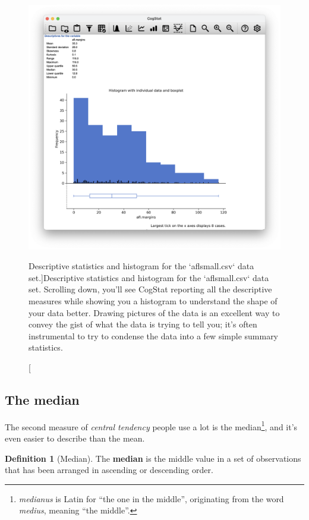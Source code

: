 \documentclass[
  11pt,
]{book}
\theoremstyle{definition}
\newtheorem{definition}{Definition}[chapter]
\theoremstyle{definition}
\theoremstyle{definition}
\theoremstyle{definition}
\theoremstyle{remark}
\begin{document}
\begin{figure}

{\centering \includegraphics[width=0.66\linewidth]{resources/image/cogstathistogramaflsmall} 

}

\caption[Descriptive statistics and histogram for the `aflsmall.csv` data set.]{Descriptive statistics and histogram for the `aflsmall.csv` data set. Scrolling down, you'll see CogStat reporting all the descriptive measures while showing you a histogram to understand the shape of your data better. Drawing pictures of the data is an excellent way to convey the gist of what the data is trying to tell you; it's often instrumental to try to condense the data into a few simple summary statistics.}\label{fig:histogramaflsmall}
\end{figure}

\hypertarget{median}{%
\subsection{The median}\label{median}}

The second measure of \emph{central tendency} people use a lot is the median\footnote{\emph{medianus} is Latin for ``the one in the middle'', originating from the word \emph{medius}, meaning ``the middle''.}, and it's even easier to describe than the mean.

\begin{definition}[Median]
\protect\hypertarget{def:defmedian}{}\label{def:defmedian}The \textbf{median} is the middle value in a set of observations that has been arranged in ascending or descending order.
\end{definition}
\end{document}
